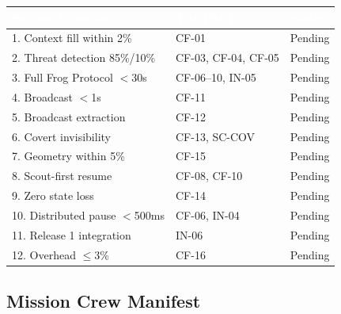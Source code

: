 \documentclass[11pt,letterpaper]{article}
\newcommand{\tableheader}[1]{\textbf{\sffamily\textcolor{white}{#1}}}
\begin{document}
\begin{center}
\begin{tabularx}{\textwidth}{XL{3.5cm}C{1.5cm}}
\toprule
{}
\tableheader{Success Criterion} & \tableheader{Test ID(s)} & \tableheader{Status} \\
. Context fill within 2\% & CF-01 & Pending \\
2. Threat detection 85\%/10\% & CF-03, CF-04, CF-05 & Pending \\
3. Full Frog Protocol $<$30s & CF-06--10, IN-05 & Pending \\
4. Broadcast $<$1s & CF-11 & Pending \\
5. Broadcast extraction & CF-12 & Pending \\
6. Covert invisibility & CF-13, SC-COV & Pending \\
7. Geometry within 5\% & CF-15 & Pending \\
8. Scout-first resume & CF-08, CF-10 & Pending \\
9. Zero state loss & CF-14 & Pending \\
10. Distributed pause $<$500ms & CF-06, IN-04 & Pending \\
11. Release 1 integration & IN-06 & Pending \\
12. Overhead $\leq$3\% & CF-16 & Pending \\
\bottomrule
\end{tabularx}
\end{center}

\subsection{Mission Crew Manifest}
\end{document}
